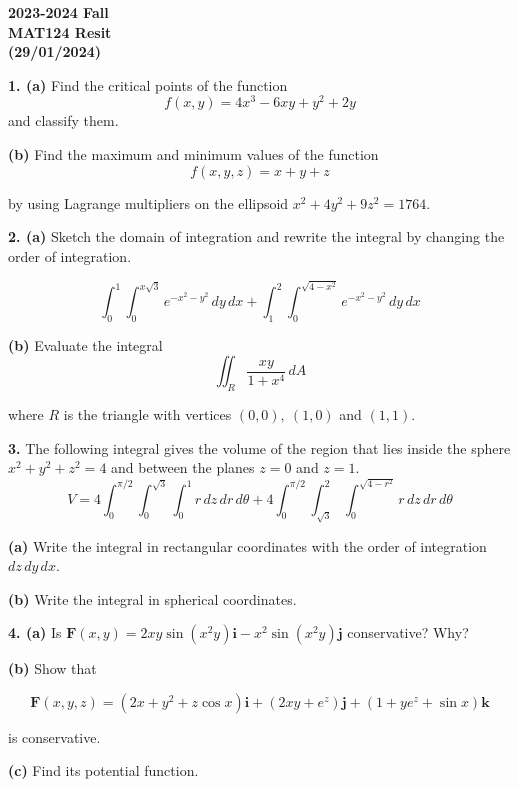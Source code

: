 \documentclass{article}
\begin{document}
\pagestyle{empty}
\large

\begin{center}
\textbf{2023-2024 Fall \\MAT124 Resit\\(29/01/2024)}
\end{center}

\textbf{1. (a)} Find the critical points of the function
\[f(x,y)=4x^3-6xy+y^2+2y\]
and classify them.

\textbf{(b)} Find the maximum and minimum values of the function
\[f(x,y,z)=x+y+z\]

by using Lagrange multipliers on the ellipsoid $x^2+4y^2+9z^2=1764$.

\vspace{1em}

\textbf{2. (a)} Sketch the domain of integration and rewrite the integral by changing the order of integration.

\[\int_0^1\int_0^{x\sqrt3}{e}^{-x^2-y^2}\,dy\,dx+\int_1^2\int_0^{\sqrt{4-x^2}}{e}^{-x^2-y^2}\,dy\,dx\]

\textbf{(b)} Evaluate the integral
\[\iint_R\frac{xy}{1+x^4}\,dA\]

where $R$ is the triangle with vertices $(0,0),\:(1,0)$ and $(1,1)$.

\vspace{1em}

\textbf{3.} The following integral gives the volume of the region that lies inside the sphere $x^2+y^2+z^2=4$ and between the planes $z=0$ and $z=1$.
\[V=4\int_0^{\pi/2}\int_0^{\sqrt3}\int_0^1r\,dz\,dr\,d\theta+4\int_0^{\pi/2}\int_{\sqrt3}^2\int_0^{\sqrt{4-r^2}}r\,dz\,dr\,d\theta\]

\textbf{(a)} Write the integral in rectangular coordinates with the order of integration $dz\,dy\,dx$.

\textbf{(b)} Write the integral in spherical coordinates.

\vspace{1em}

\textbf{4. (a)} Is $\mathbf{F}(x,y)=2xy\sin\left(x^2y\right)\mathbf{i}-x^2\sin\left(x^2y\right)\mathbf{j}$ conservative? Why?

\textbf{(b)} Show that

\[\mathbf{F}(x,y,z)=\left(2x+y^2+z\cos x\right)\mathbf{i}+\left(2xy+{e}^z\right)\mathbf{j}+\left(1+y{e}^z+\sin x\right)\mathbf{k}\]

is conservative.

\textbf{(c)} Find its potential function.
\end{document}
